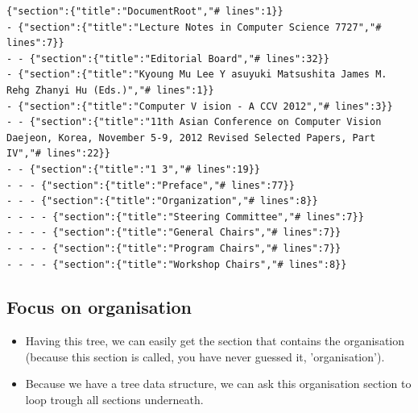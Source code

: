 \documentclass{ou-report}
\begin{document}
\begin{lstlisting}[caption={Representation of the document},captionpos=b]
{"section":{"title":"DocumentRoot","# lines":1}}
- {"section":{"title":"Lecture Notes in Computer Science 7727","# lines":7}}
- - {"section":{"title":"Editorial Board","# lines":32}}
- {"section":{"title":"Kyoung Mu Lee Y asuyuki Matsushita James M. Rehg Zhanyi Hu (Eds.)","# lines":1}}
- {"section":{"title":"Computer V ision - A CCV 2012","# lines":3}}
- - {"section":{"title":"11th Asian Conference on Computer Vision Daejeon, Korea, November 5-9, 2012 Revised Selected Papers, Part IV","# lines":22}}
- - {"section":{"title":"1 3","# lines":19}}
- - - {"section":{"title":"Preface","# lines":77}}
- - - {"section":{"title":"Organization","# lines":8}}
- - - - {"section":{"title":"Steering Committee","# lines":7}}
- - - - {"section":{"title":"General Chairs","# lines":7}}
- - - - {"section":{"title":"Program Chairs","# lines":7}}
- - - - {"section":{"title":"Workshop Chairs","# lines":8}}
\end{lstlisting}


\subsection{Focus on organisation}
\begin{itemize}
    \item Having this tree, we can easily get the section that contains the 
        organisation (because this section is called, you have never guessed it, 
        'organisation').
    \item Because we have a tree data structure, we can ask this organisation 
        section to loop trough all sections underneath.
\end{itemize}
\end{document}
